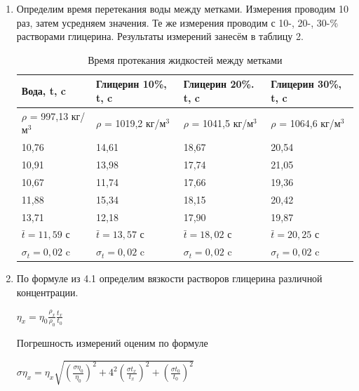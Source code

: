 \documentclass[a4paper]{article}
\begin{document}
\begin{enumerate}
    \item Определим время перетекания воды между метками. Измерения проводим 10 раз, затем усредняем значения. Те же измерения проводим с 10-, 20-, 30-\% растворами глицерина. Результаты измерений занесём в таблицу 2.

    \begin{table}[h]
    \centering
    \begin{center}
    \caption{Время протекания жидкостей между метками}
    \end{center}
    \vspace{0.05cm}
    \label{tab:my_label}
    \begin{tabular}{ |p{3cm}|p{3cm}|p{3cm}|p{3cm}| }
    \hline
     Вода, t, c & Глицерин 10\%, t, c & Глицерин 20\%. t, c & Глицерин 30\%, t, c \\ 
    \hline
    $\rho$ = 997,13 кг/м$^3$ & $\rho$ = 1019,2 кг/м$^3$ & $\rho$ = 1041,5 кг/м$^3$ & $\rho$ = 1064,6 кг/м$^3$\\
    \hline
    10,76 & 14,61 & 18,67 & 20,54\\
    10,91 & 13,98 & 17,74 & 21,05\\
    10,67 & 11,74 & 17,66 & 19,36\\
    11,88 & 15,34 & 18,15 & 20,42\\
    13,71 & 12,18 & 17,90 & 19,87\\
    
    \hline
    \hline
    
    $\bar t = 11,59$ с & $\bar t = 13,57$ с & $\bar t = 18,02$ с & $\bar t = 20,25$ с \\
    \hline
    $\sigma_t = 0,02$ c & $\sigma_t = 0,02$ c & $\sigma_t = 0,02$ c & $\sigma_t = 0,02$ c \\
    \hline
    \end{tabular}
    \end{table}  
    
    \item По формуле из 4.1 определим вязкости растворов глицерина различной концентрации. 
    \begin{center}
    $\eta_x = \eta_0\frac{\rho_x}{\rho_0}\frac{t_x}{t_0}$
    \end{center}
    Погрешность измерений оценим по формуле
    \begin{center}
     $\sigma \eta_x = \eta_x \sqrt{(\frac{\sigma \eta_0}{\eta_0})^2 + 4^2(\frac{\sigma t_x}{t_x})^2 + (\frac{\sigma t_0}{t_0})^2}$
    \end{center}
    

\end{enumerate}
\end{document}

